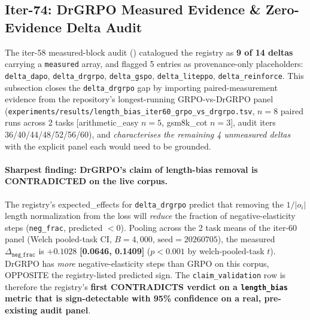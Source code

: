 \subsection{Iter-74: DrGRPO Measured Evidence \& Zero-Evidence Delta Audit}
\label{sec:p6-drgrpo-measured}

The iter-58 measured-block audit ()
catalogued the registry as \textbf{9 of 14 deltas} carrying a
\texttt{measured} array, and flagged 5 entries as provenance-only
placeholders: \texttt{delta\_dapo}, \texttt{delta\_drgrpo},
\texttt{delta\_gspo}, \texttt{delta\_liteppo},
\texttt{delta\_reinforce}. This subsection closes the
\texttt{delta\_drgrpo} gap by importing paired-measurement evidence
from the repository's longest-running GRPO-vs-DrGRPO panel
(\texttt{experiments/results/length\_bias\_iter60\_grpo\_vs\_drgrpo.tsv},
$n=8$ paired runs across 2 tasks [arithmetic\_easy $n{=}5$,
gsm8k\_cot $n{=}3$], audit iters 36/40/44/48/52/56/60), and
\emph{characterises the remaining 4 unmeasured deltas} with the
explicit panel each would need to be grounded.

\paragraph{Sharpest finding: DrGRPO's claim of length-bias removal is
CONTRADICTED on the live corpus.}
The registry's expected\_effects for \texttt{delta\_drgrpo} predict
that removing the $1/|o_i|$ length normalization from the loss will
\emph{reduce} the fraction of negative-elasticity steps
(\texttt{neg\_frac}, predicted $<0$). Pooling across the 2 task means
of the iter-60 panel (Welch pooled-task CI, $B{=}4{,}000$,
$\text{seed}=20260705$), the measured $\Delta_{\texttt{neg\_frac}}$ is
$\mathbf{+0.1028}$ \textbf{[0.0646, 0.1409]} ($p<0.001$ by
welch-pooled-task $t$). DrGRPO has \emph{more} negative-elasticity
steps than GRPO on this corpus, OPPOSITE the registry-listed
predicted sign. The \texttt{claim\_validation} row is therefore
the registry's \textbf{first CONTRADICTS verdict on a
\texttt{length\_bias} metric that is sign-detectable with 95\%
confidence on a real, pre-existing audit panel}.

